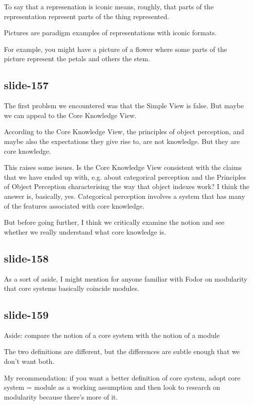 \documentclass[12pt,\papersize]{extarticle}
\begin{document}
To say that a represenation is iconic means, roughly, that parts of the representation represent parts of the thing represented.
 
Pictures are paradigm examples of representations with iconic formats.
 
For example, you might have a picture of a flower where some parts of the picture represent the petals and others the stem.
 
\subsection{slide-157}
The first problem we encountered was that the Simple View is false.
But maybe we can appeal to the Core Knowledge View.
 
According to the Core Knowledge View, the principles of object perception, and maybe also the 
expectations they give rise to, are not knowledge.
But they are core knowledge.
 
This raises some issues.  Is the Core Knowledge View consistent with the claims that 
we have ended up with, e.g. about categorical perception and the Principles of Object 
Perception characterising the way that object indexes work?
I think the answer is, basically, yes.  Categorical perception involves a system that has
many of the features associated with core knowledge.
 
But before going further, I think we critically examine the notion and see whether we really
understand what core knowledge is.
 
\subsection{slide-158}
As a sort of aside, I might mention for anyone familiar with Fodor on modularity 
that core systems basically coincide modules.
 
\subsection{slide-159}
Aside: compare the notion of a core system with the notion of a module
 
The two definitions are different, but the differences are subtle enough that we don't want both.
 
My recommendation: if you want a better definition of core system, adopt core system = module as a working assumption and then look to research on modularity because there's more of it.
 
\end{document}
